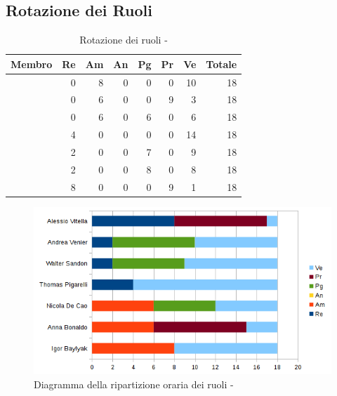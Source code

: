 \documentclass[12pt,a4paper]{article}
\begin{document}
\newpage

\subsection{Rotazione dei Ruoli}

\begin{table}[H]
	\begin{center}
		\begin{tabular}{l r r r r r r r}
			\toprule
			\textbf{Membro}	&	\textbf{Re}	&	\textbf{Am}	& \textbf{An} & \textbf{Pg} & \textbf{Pr} & \textbf{Ve} & \textbf{Totale}\\
			\midrule
			\midrule
			\IB & 0 & 8 & 0 & 0 & 0 & 10 & 18 \\
			\midrule
			\AB & 0 & 6 & 0 & 0 & 9 & 3 & 18 \\
			\midrule
			\NDC & 0 & 6 & 0 & 6 & 0 & 6 & 18 \\
			\midrule
			\TP & 4 & 0 & 0 & 0 & 0 &14 & 18 \\
			\midrule
			\WS & 2 & 0 & 0 & 7 & 0 & 9 & 18 \\
			\midrule
			\AVE & 2 & 0 & 0 & 8 & 0 & 8 & 18 \\
			\midrule
			\AVI & 8 & 0 & 0 & 0 & 9 & 1 & 18 \\
			\bottomrule
		\end{tabular}
		\caption{Rotazione dei ruoli - \FVV}
	\end{center}
\end{table}

\begin{center}
	\begin{figure}[H]
		\centering
		\includegraphics[width=\textwidth]{diagrammaBarreVerificaValidazioneRotazioneRuoli.png}
		\caption{Diagramma della ripartizione oraria dei ruoli - \FVV}
	\end{figure}
\end{center}
\end{document}
